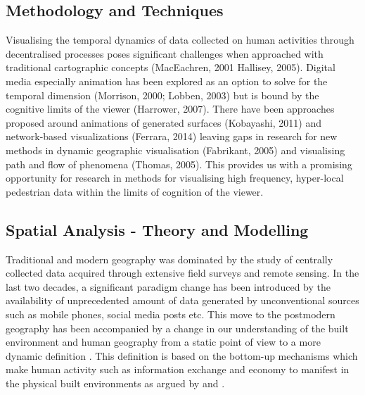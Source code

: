 
\subsection{Methodology and Techniques}

\citep{maceachren2001}
\citep{hallisey2005}
\citep{morrison2000}
\citep{lobben2003}
\citep{harrower2007}
\citep{ferrara2014}
\citep{fabrikant2005}
\citep{thomas2005}

Visualising the temporal dynamics of data collected on human activities through decentralised processes poses significant challenges when approached with traditional cartographic concepts (MacEachren, 2001 Hallisey, 2005).
Digital media especially animation has been explored as an option to solve for the temporal dimension (Morrison, 2000; Lobben, 2003) but is bound by the cognitive limits of the viewer (Harrower, 2007).
There have been approaches proposed around animations of generated surfaces (Kobayashi, 2011) and network-based visualizations (Ferrara, 2014) leaving gaps in research for new methods in dynamic geographic visualisation (Fabrikant, 2005) and visualising path and flow of phenomena (Thomas, 2005).
This provides us with a promising opportunity for research in methods for visualising high frequency, hyper-local pedestrian data within the limits of cognition of the viewer.

\subsection{Spatial Analysis - Theory and Modelling}

Traditional and modern geography was dominated by the study of centrally collected data acquired through extensive field surveys and remote sensing.
In the last two decades, a significant paradigm change has been introduced by the availability of unprecedented amount of data generated by unconventional sources such as mobile phones, social media posts etc.
This move to the postmodern geography has been accompanied by a change in our understanding of the built environment and human geography from a static point of view to a more dynamic definition \cite{soja1989}.
This definition is based on the bottom-up mechanisms which make human activity such as information exchange and economy to manifest in the physical built environments as argued by \citep{batty1990, batty1997, batty2012} and \citep{batty2013, batty2013a}.

